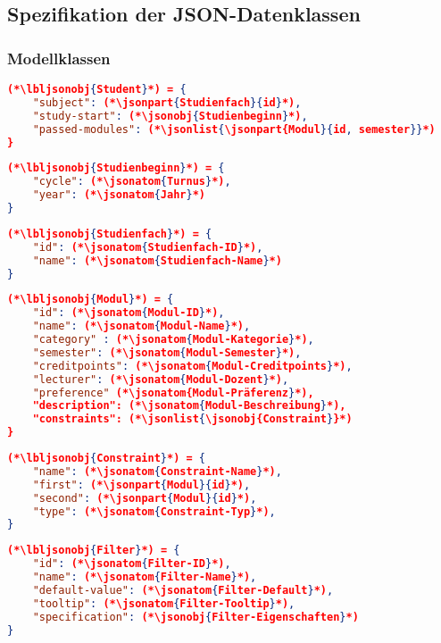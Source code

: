 \FloatBarrier
\subsection{Spezifikation der JSON-Datenklassen}

\subsubsection*{Modellklassen}

\begin{lstlisting}[language=json]
(*\lbljsonobj{Student}*) = {
	"subject": (*\jsonpart{Studienfach}{id}*),
	"study-start": (*\jsonobj{Studienbeginn}*),
	"passed-modules": (*\jsonlist{\jsonpart{Modul}{id, semester}}*)
}
\end{lstlisting}

\begin{lstlisting}[language=json]
(*\lbljsonobj{Studienbeginn}*) = {
	"cycle": (*\jsonatom{Turnus}*),
	"year": (*\jsonatom{Jahr}*)
}
\end{lstlisting}

\begin{lstlisting}[language=json]	
(*\lbljsonobj{Studienfach}*) = {
	"id": (*\jsonatom{Studienfach-ID}*),
	"name": (*\jsonatom{Studienfach-Name}*)
}
\end{lstlisting}


\begin{lstlisting}[language=json]
(*\lbljsonobj{Modul}*) = {
	"id": (*\jsonatom{Modul-ID}*),
	"name": (*\jsonatom{Modul-Name}*),
	"category" : (*\jsonatom{Modul-Kategorie}*),
	"semester": (*\jsonatom{Modul-Semester}*),
	"creditpoints": (*\jsonatom{Modul-Creditpoints}*),
	"lecturer": (*\jsonatom{Modul-Dozent}*),
	"preference" (*\jsonatom{Modul-Präferenz}*),
	"description": (*\jsonatom{Modul-Beschreibung}*),	
	"constraints": (*\jsonlist{\jsonobj{Constraint}}*)
}
\end{lstlisting}

\begin{lstlisting}[language=json]
(*\lbljsonobj{Constraint}*) = {
	"name": (*\jsonatom{Constraint-Name}*),
	"first": (*\jsonpart{Modul}{id}*),
	"second": (*\jsonpart{Modul}{id}*),
	"type": (*\jsonatom{Constraint-Typ}*),
}
\end{lstlisting}

\begin{lstlisting}[language=json]
(*\lbljsonobj{Filter}*) = {
	"id": (*\jsonatom{Filter-ID}*),
	"name": (*\jsonatom{Filter-Name}*),
	"default-value": (*\jsonatom{Filter-Default}*),
	"tooltip": (*\jsonatom{Filter-Tooltip}*),
	"specification": (*\jsonobj{Filter-Eigenschaften}*)
}
\end{lstlisting}

